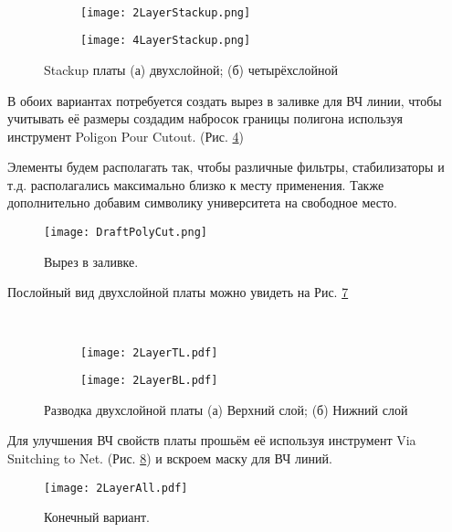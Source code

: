 \begin{figure}[H]
	\centering\
	\begin{subfigure}[b]{\textwidth}
		\centering
		\texttt{[image: 2LayerStackup.png]}
		\caption{}%
		\label{fig:2LayerStackup}
	\end{subfigure}
	\hfill
	\begin{subfigure}[b]{\textwidth}
		\centering
		\texttt{[image: 4LayerStackup.png]}
		\caption{}%
		\label{fig:4LayerStackup}
	\end{subfigure}
	\caption{%
		Stackup платы
		(а) двухслойной;
		(б) четырёхслойной
	}%
	\label{fig:Stackup}
\end{figure}

В обоих вариантах потребуется создать вырез в заливке для ВЧ линии, чтобы учитывать её размеры создадим набросок границы полигона используя инструмент Poligon Pour Cutout. (Рис. \ref{fig:DraftPolyCut})

Элементы будем располагать так, чтобы различные фильтры, стабилизаторы и т.д. располагались максимально близко к месту применения. Также дополнительно добавим символику университета на свободное место.

\begin{figure}[H]
	\centering
	\texttt{[image: DraftPolyCut.png]}
	\caption{Вырез в заливке.}%
	\label{fig:DraftPolyCut}
\end{figure}

Послойный вид двухслойной платы можно увидеть на Рис. \ref{fig:2LayerPCB}

\begin{figure}[H]
	\centering\
	\begin{subfigure}[b]{0.45\textwidth}
		\centering
		\texttt{[image: 2LayerTL.pdf]}
		\caption{}%
		\label{fig:2LayerTL}
	\end{subfigure}
	\hfill
	\begin{subfigure}[b]{0.45\textwidth}
		\centering
		\texttt{[image: 2LayerBL.pdf]}
		\caption{}%
		\label{fig:2LayerBL}
	\end{subfigure}
	\caption{%
		Разводка двухслойной платы
		(а) Верхний слой;
		(б) Нижний слой
	}%
	\label{fig:2LayerPCB}
\end{figure}
 Для улучшения ВЧ свойств платы прошьём её используя инструмент Via Snitching to Net. (Рис. \ref{fig:2LayerAll}) и вскроем маску для ВЧ линий.
 \begin{figure}[H]
 	\centering
 	\texttt{[image: 2LayerAll.pdf]}
 	\caption{Конечный вариант.}%
 	\label{fig:2LayerAll}
 \end{figure}

